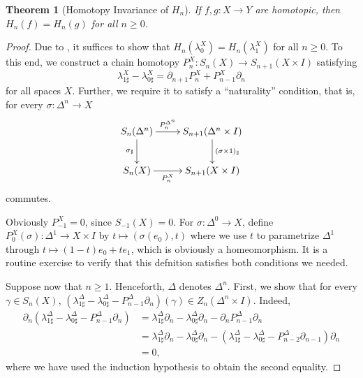 \documentclass[10pt]{article}
\theoremstyle{thmstyle}
\newtheorem{theorem}{Theorem}[section]
\theoremstyle{defstyle}
\renewcommand{\ge}{\geqslant}
\begin{document}
\begin{theorem}[Homotopy Invariance of $H_n$]
    If $f, g: X\to Y$ are homotopic, then $H_n(f) = H_n(g)$ for all $n\ge 0$.
\end{theorem}
\begin{proof}
    Due to , it suffices to show that $H_n(\lambda^X_0) = H_n(\lambda^X_1)$ for all $n\ge 0$. To this end, we construct a chain homotopy $P_n^X: S_n(X)\to S_{n + 1}(X\times I)$ satisfying 
    \begin{equation*}
        {\lambda^X_{1\sharp}} - \lambda^X_{0\sharp} = \partial_{n + 1}P_n^X + P_{n - 1}^X\partial_n
    \end{equation*}
    for all spaces $X$. Further, we require it to satisfy a ``naturality'' condition, that is, for every $\sigma:\Delta^n\to X$
    \begin{equation*}
        \xymatrix {
            S_n(\Delta^n)\ar[r]^-{P_n^{\Delta^n}}\ar[d]_{\sigma_\sharp} & S_{n + 1}(\Delta^n\times I)\ar[d]^{(\sigma\times 1)_\sharp}\\
            S_n(X)\ar[r]_-{P_n^{X}} & S_{n + 1}(X\times I)
        }
    \end{equation*}
    commutes.

    Obviously $P_{-1}^X = 0$, since $S_{-1}(X) = 0$. For $\sigma:\Delta^0\to X$, define $P^X_0(\sigma): \Delta^1\to X\times I$ by $t\mapsto(\sigma(e_0), t)$ where we use $t$ to parametrize $\Delta^1$ through $t\mapsto (1 - t)e_0 + te_1$, which is obviously a homeomorphism. It is a routine exercise to verify that this defnition satisfies both conditions we needed.

    Suppose now that $n\ge 1$. Henceforth, $\Delta$ denotes $\Delta^n$. First, we show that for every $\gamma\in S_n(X)$, $(\lambda^\Delta_{1\sharp} - \lambda^\Delta_{0\sharp} - P^{\Delta}_{n - 1}\partial_n)(\gamma)\in Z_n(\Delta^n\times I)$. Indeed,
    \begin{align*}
        \partial_n(\lambda^\Delta_{1\sharp} - \lambda^\Delta_{0\sharp} - P^{\Delta}_{n - 1}\partial_n) &= \lambda^\Delta_{1\sharp}\partial_n - \lambda^\Delta_{0\sharp}\partial_n - \partial_nP^\Delta_{n - 1}\partial_n\\
        &= \lambda^\Delta_{1\sharp}\partial_n - \lambda^\Delta_{0\sharp}\partial_n - \left(\lambda^\Delta_{1\sharp} - \lambda^\Delta_{0\sharp} - P^{\Delta}_{n - 2}\partial_{n - 1}\right)\partial_n\\
        &= 0,
    \end{align*}
    where we have used the induction hypothesis to obtain the second equality.


\end{proof}
\end{document}
